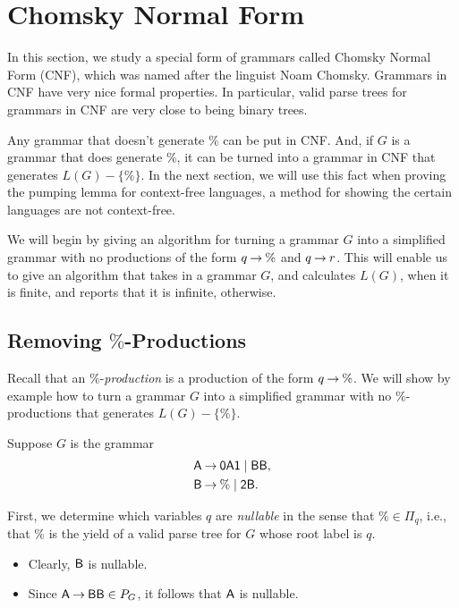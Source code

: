 \section{Chomsky Normal Form}
\label{ChomskyNormalForm}

In this section, we study a special form of grammars called Chomsky
Normal Form (CNF), which was named after the linguist Noam Chomsky.
Grammars in CNF have very nice formal properties.  In particular,
valid parse trees for grammars in CNF are very close to being binary
trees.

Any grammar that doesn't generate $\%$ can be put in CNF.  And, if $G$
is a grammar that does generate $\%$, it can be turned into a grammar
in CNF that generates $L(G)-\{\%\}$.  In the next section, we will use
this fact when proving the pumping lemma for context-free languages, a
method for showing the certain languages are not context-free.

We will begin by giving an algorithm for turning a grammar $G$ into a
simplified grammar with no productions of the form $q\mathbin{\to}\%$ and
$q\mathbin{\to} r$. This will enable us to give an algorithm that takes in a
grammar $G$, and calculates $L(G)$, when it is finite, and reports
that it is infinite, otherwise.

\subsection{Removing $\%$-Productions}

%
Recall that an $\%$-\emph{production} is a production of the form
$q\mathbin{\to}\%$.  We will show by example how to turn a grammar $G$ into a
simplified grammar with no $\%$-productions that generates
$L(G)-\{\%\}$.

Suppose $G$ is the grammar
\begin{align*}
\mathsf{A} &\mathbin{\to} \mathsf{0A1} \mid \mathsf{BB} , \\
\mathsf{B} &\mathbin{\to} \% \mid \mathsf{2B} .
\end{align*}

First, we determine which variables $q$ are \emph{nullable} in the
sense that $\%\in\Pi_q$, i.e., that $\%$ is the yield of a valid parse
tree for $G$ whose root label is $q$.
\begin{itemize}
\item Clearly, $\mathsf{B}$ is nullable.

\item Since $\mathsf{A}\mathbin{\to}\mathsf{B}\mathsf{B}\in P_G$, it follows that $\mathsf{A}$ is
  nullable.
\end{itemize}

